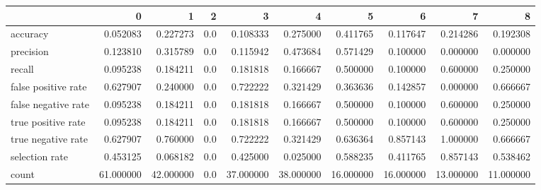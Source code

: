 \begin{tabular}{lrrrrrrrrr}
\toprule
{} &          0 &          1 &    2 &          3 &          4 &          5 &          6 &          7 &          8 \\
\midrule
accuracy            &   0.052083 &   0.227273 &  0.0 &   0.108333 &   0.275000 &   0.411765 &   0.117647 &   0.214286 &   0.192308 \\
precision           &   0.123810 &   0.315789 &  0.0 &   0.115942 &   0.473684 &   0.571429 &   0.100000 &   0.000000 &   0.000000 \\
recall              &   0.095238 &   0.184211 &  0.0 &   0.181818 &   0.166667 &   0.500000 &   0.100000 &   0.600000 &   0.250000 \\
false positive rate &   0.627907 &   0.240000 &  0.0 &   0.722222 &   0.321429 &   0.363636 &   0.142857 &   0.000000 &   0.666667 \\
false negative rate &   0.095238 &   0.184211 &  0.0 &   0.181818 &   0.166667 &   0.500000 &   0.100000 &   0.600000 &   0.250000 \\
true positive rate  &   0.095238 &   0.184211 &  0.0 &   0.181818 &   0.166667 &   0.500000 &   0.100000 &   0.600000 &   0.250000 \\
true negative rate  &   0.627907 &   0.760000 &  0.0 &   0.722222 &   0.321429 &   0.636364 &   0.857143 &   1.000000 &   0.666667 \\
selection rate      &   0.453125 &   0.068182 &  0.0 &   0.425000 &   0.025000 &   0.588235 &   0.411765 &   0.857143 &   0.538462 \\
count               &  61.000000 &  42.000000 &  0.0 &  37.000000 &  38.000000 &  16.000000 &  16.000000 &  13.000000 &  11.000000 \\
\bottomrule
\end{tabular}
